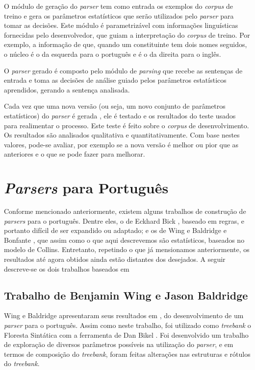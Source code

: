 O módulo de geração do \emph{parser} tem como entrada os exemplos do \emph{corpus} de treino e gera os parâmetros estatísticos que serão utilizados pelo \emph{parser} para tomar as decisões. Este módulo é parametrizável com informações linguísticas fornecidas pelo desenvolvedor, que guiam a interpretação do \emph{corpus} de treino. Por exemplo, a informação de que, quando um constituinte tem dois nomes seguidos, o núcleo é o da esquerda para o português e é o da direita para o inglês.

O \emph{parser} gerado é composto pelo módulo de \emph{parsing} que recebe as sentenças de entrada e toma as decisões de análise guiado pelos parâmetros estatísticos aprendidos, gerando a sentença analisada.

Cada vez que uma nova versão (ou seja, um novo conjunto de parâmetros estatísticos) do \emph{parser} é gerada , ele é testado e os resultados do teste usados para realimentar o processo. Este teste é feito sobre o \emph{corpus} de desenvolvimento. Os resultados são analisados qualitativa e quantitativamente. Com base nestes valores, pode-se avaliar, por exemplo se a nova versão é melhor ou pior que as anteriores e o que se pode fazer para melhorar.


\section{\emph{Parsers} para Português} %
\label{sec:parsers_para_portugues}

Conforme mencionado anteriormente, existem alguns trabalhos de construção de \emph{parsers} para o português. Dentre eles, o de Eckhard Bick \cite{bick00}, baseado em regras, e portanto difícil de ser expandido ou adaptado; e os de Wing e Baldridge \cite{baldridge06} e Bonfante \cite{bonfante03}, que assim como o que aqui descrevemos são estatísticos, baseados no modelo de Collins. Entretanto, repetindo o que já mensionamos anteriormente, os resultados até agora obtidos ainda estão distantes dos desejados. A seguir descreve-se os dois trabalhos baseados em \cite{collins99}


\subsection{Trabalho de Benjamin Wing e Jason Baldridge} %
\label{sec:wing_baldridge}

Wing e Baldridge apresentaram seus resultados em \cite{baldridge06}, do desenvolvimento de um \emph{parser} para o português. Assim como neste trabalho, foi utilizado como \emph{treebank} o Floresta Sintática com a ferramenta de Dan Bikel \cite{bikel02}. Foi desenvolvido um trabalho de exploração de diversos parâmetros possíveis na utilização do \emph{parser}, e em termos de composição do \emph{treebank}, foram feitas alterações nas estruturas e rótulos do \emph{treebank}.

